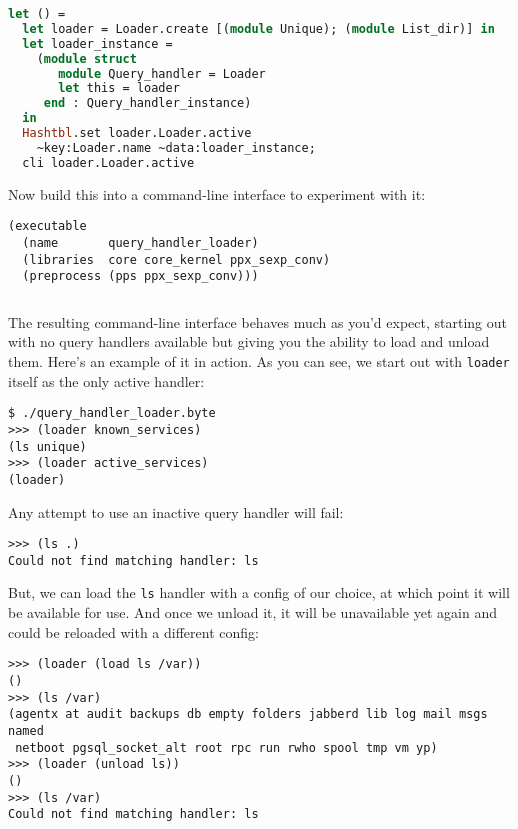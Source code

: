 \begin{lstlisting}[language=Caml]
let () =
  let loader = Loader.create [(module Unique); (module List_dir)] in
  let loader_instance =
    (module struct
       module Query_handler = Loader
       let this = loader
     end : Query_handler_instance)
  in
  Hashtbl.set loader.Loader.active
    ~key:Loader.name ~data:loader_instance;
  cli loader.Loader.active
\end{lstlisting}

Now build this into a command-line interface to experiment with it:

\begin{lstlisting}
(executable
  (name       query_handler_loader)
  (libraries  core core_kernel ppx_sexp_conv)
  (preprocess (pps ppx_sexp_conv)))
\end{lstlisting}

\begin{lstlisting}[language=bash]
\end{lstlisting}

The resulting command-line interface behaves much as you'd expect,
starting out with no query handlers available but giving you the ability
to load and unload them. Here's an example of it in action. As you can
see, we start out with \passthrough{\lstinline!loader!} itself as the
only active handler:

\begin{lstlisting}
$ ./query_handler_loader.byte
>>> (loader known_services)
(ls unique)
>>> (loader active_services)
(loader)
\end{lstlisting}

Any attempt to use an inactive query handler will fail:

\begin{lstlisting}
>>> (ls .)
Could not find matching handler: ls
\end{lstlisting}

But, we can load the \passthrough{\lstinline!ls!} handler with a config
of our choice, at which point it will be available for use. And once we
unload it, it will be unavailable yet again and could be reloaded with a
different config:

\begin{lstlisting}
>>> (loader (load ls /var))
()
>>> (ls /var)
(agentx at audit backups db empty folders jabberd lib log mail msgs named
 netboot pgsql_socket_alt root rpc run rwho spool tmp vm yp)
>>> (loader (unload ls))
()
>>> (ls /var)
Could not find matching handler: ls
\end{lstlisting}

